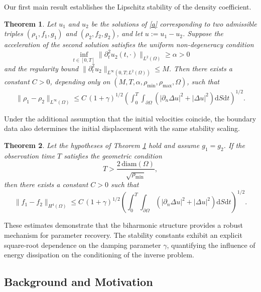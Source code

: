 \documentclass[12pt,reqno]{amsart}
\newtheorem{theo}{Theorem}[section]
\numberwithin{equation}{section}
\begin{document}
	Our first main result establishes the Lipschitz stability of the density coefficient.
	
	\begin{theo}\label{th1}
		Let $u_{1}$ and $u_{2}$ be the solutions of \eqref{a} corresponding to two admissible triples $(\rho_{1},f_{1},g_{1})$ and $(\rho_{2},f_{2},g_{2})$, and let $u := u_{1} - u_{2}$. 
		Suppose the acceleration of the second solution satisfies the uniform non-degeneracy condition
		\[
		\inf_{t\in[0,T]} \|\partial_t^2 u_2(t,\cdot)\|_{L^2(\Omega)} \ge \alpha > 0
		\]
		and the regularity bound $\|\partial_t^2 u_2\|_{L^{\infty}(0,T;L^{2}(\Omega))} \le M$. Then there exists a constant $C > 0$, depending only on $(M,T,\alpha,\rho_{\min},\rho_{\max},\Omega)$, such that
		\begin{align}\label{eq:stability-estimate}
			\|\rho_{1}-\rho_{2}\|_{L^{\infty}(\Omega)}
			\le C\,(1+\gamma)^{1/2} \left( \int_{0}^{T}\int_{\partial\Omega} \left( \left| \partial_n \Delta u \right|^{2} + |\Delta u|^{2} \right) \mathrm{d} S \mathrm{d}t \right)^{1/2}.
		\end{align}
	\end{theo}
	
	Under the additional assumption that the initial velocities coincide, the boundary data also determines the initial displacement with the same stability scaling.
	
	\begin{theo}\label{th2}
		Let the hypotheses of Theorem \ref{th1} hold and assume $g_{1}=g_{2}$. If the observation time $T$ satisfies the geometric condition
		\[
		T > \frac{2\,\mathrm{diam}(\Omega)}{\sqrt{\rho_{\min}}},
		\]
		then there exists a constant $C > 0$ such that
		\[
		\|f_{1}-f_{2}\|_{H^{4}(\Omega)}
		\le C\,(1+\gamma)^{1/2} \left( \int_{0}^{T}\int_{\partial\Omega} \left( \left| \partial_n \Delta u \right|^{2} + |\Delta u|^{2} \right) \mathrm{d}S \mathrm{d}t \right)^{1/2}.
		\]
	\end{theo}
	
	\noindent
	These estimates demonstrate that the biharmonic structure provides a robust mechanism for parameter recovery. The stability constants exhibit an explicit square-root dependence on the damping parameter $\gamma$, quantifying the influence of energy dissipation on the conditioning of the inverse problem.
	
	\subsection{Background and Motivation}
	
\end{document}
